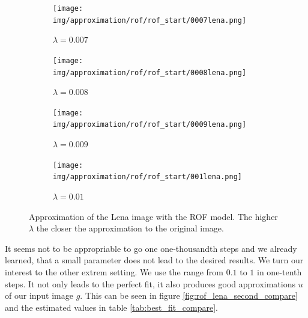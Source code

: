 \documentclass{scrreprt}
\begin{document}
\begin{figure}[!ht]
                \begin{subfigure}[b]{0.18\textwidth}
                    \texttt{[image: img/approximation/rof/rof\_start/0007lena.png]}
                    \caption{$\lambda = 0.007$}
                \end{subfigure}
                \begin{subfigure}[b]{0.18\textwidth}
                    \texttt{[image: img/approximation/rof/rof\_start/0008lena.png]}
                    \caption{$\lambda = 0.008$}
                \end{subfigure}
                \begin{subfigure}[b]{0.18\textwidth}
                    \texttt{[image: img/approximation/rof/rof\_start/0009lena.png]}
                    \caption{$\lambda = 0.009$}
                \end{subfigure}
                \begin{subfigure}[b]{0.18\textwidth}
                    \texttt{[image: img/approximation/rof/rof\_start/001lena.png]}
                    \caption{$\lambda = 0.01$}
                \end{subfigure}
                \caption[First estimate of $\lambda$ for the ROF model.]{Approximation of the Lena image with the ROF model. The higher $\lambda$ the closer the approximation to the original image.}
            \label{fig:rof_lena_first_compare}
            \end{figure}

            It seems not to be appropriable to go one one-thousandth steps and we already learned, that a small parameter does not lead to the desired results. We turn our interest to the other extrem setting. We use the range from $0.1$ to $1$ in one-tenth steps. It not only leads to the perfect fit, it also produces good approximations $u$ of our input image $g$. This can be seen in figure \ref{fig:rof_lena_second_compare} and the estimated values in table \ref{tab:best_fit_compare}.
\end{document}
